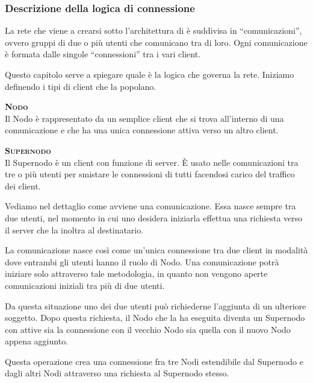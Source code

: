 \subsubsection{Descrizione della logica di connessione}
La rete che viene a crearsi sotto l'architettura di \caName{} è suddivisa in ``comunicazioni'', ovvero gruppi di due o più utenti che comunicano tra di loro. Ogni comunicazione è formata dalle singole ``connessioni'' tra i vari client.

Questo capitolo serve a spiegare quale è la logica che governa la rete. Iniziamo definendo i tipi di client che la popolano.
\begin{description}
	\item{\scshape\bfseries Nodo}\\
	Il Nodo è rappresentato da un semplice client che si trova all'interno di una comunicazione e che ha una unica connessione attiva verso un altro client.
	\item{\scshape\bfseries Supernodo}\\
	Il Supernodo è un client con funzione di server. È usato nelle comunicazioni tra tre o più utenti per smistare le connessioni di tutti facendosi carico del traffico dei client.
\end{description}

Vediamo nel dettaglio come avviene una comunicazione. Essa nasce sempre tra due utenti, nel momento in cui uno desidera iniziarla effettua una richiesta verso il server che la inoltra al destinatario.

La comunicazione nasce così come un'unica connessione tra due client in modalità \underline{} dove entrambi gli utenti hanno il ruolo di Nodo. Una comunicazione potrà iniziare solo attraverso tale metodologia, in quanto non vengono aperte comunicazioni iniziali tra più di due utenti.

Da questa situazione uno dei due utenti può richiederne l'aggiunta di un ulteriore soggetto. Dopo questa richiesta, il Nodo che la ha eseguita diventa un Supernodo con attive sia la connessione con il vecchio Nodo sia quella con il nuovo Nodo appena aggiunto.

Questa operazione crea una connessione fra tre Nodi estendibile dal Supernodo e dagli altri Nodi attraverso una richiesta al Supernodo stesso.


